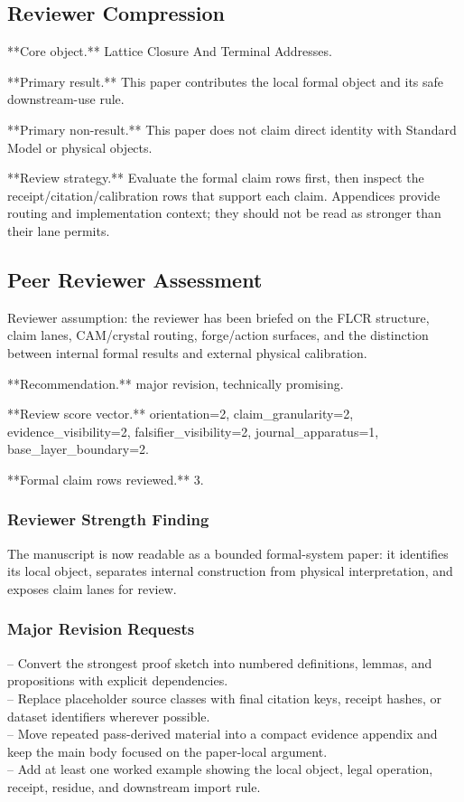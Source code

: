 \documentclass[11pt]{article}
\begin{document}
\subsection*{Reviewer Compression}

**Core object.** Lattice Closure And Terminal Addresses.

**Primary result.** This paper contributes the local formal object and its safe downstream-use rule.

**Primary non-result.** This paper does not claim direct identity with Standard Model or physical objects.

**Review strategy.** Evaluate the formal claim rows first, then inspect the receipt/citation/calibration rows that support each claim. Appendices provide routing and implementation context; they should not be read as stronger than their lane permits.

\subsection*{Peer Reviewer Assessment}

Reviewer assumption: the reviewer has been briefed on the FLCR structure, claim lanes, CAM/crystal routing, forge/action surfaces, and the distinction between internal formal results and external physical calibration.

**Recommendation.** major revision, technically promising.

**Review score vector.** orientation=2, claim\_granularity=2, evidence\_visibility=2, falsifier\_visibility=2, journal\_apparatus=1, base\_layer\_boundary=2.

**Formal claim rows reviewed.** 3.

\subsubsection*{Reviewer Strength Finding}

The manuscript is now readable as a bounded formal-system paper: it identifies its local object, separates internal construction from physical interpretation, and exposes claim lanes for review.

\subsubsection*{Major Revision Requests}

\noindent{}-- Convert the strongest proof sketch into numbered definitions, lemmas, and propositions with explicit dependencies.\\
\noindent{}-- Replace placeholder source classes with final citation keys, receipt hashes, or dataset identifiers wherever possible.\\
\noindent{}-- Move repeated pass-derived material into a compact evidence appendix and keep the main body focused on the paper-local argument.\\
\noindent{}-- Add at least one worked example showing the local object, legal operation, receipt, residue, and downstream import rule.\\
\end{document}
